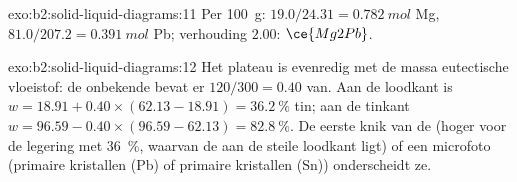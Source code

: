 \begin{solution}{exo:b2:solid-liquid-diagrams:11}
Per \qty{100}{g}: $19.0/24.31 = \qty{0.782}{mol}$ Mg, $81.0/207.2 =
\qty{0.391}{mol}$ Pb; verhouding $2.00$: $\ce{Mg2Pb}$.
\end{solution}

\begin{solution}{exo:b2:solid-liquid-diagrams:12}
Het plateau is evenredig met de massa eutectische vloeistof: de onbekende bevat
er $120/300 = 0.40$ van. Aan de loodkant is $w = 18.91 + 0.40 \times (62.13 -
18.91) = 36.2~\%$ tin; aan de tinkant $w = 96.59 - 0.40 \times (96.59 - 62.13) =
82.8~\%$. De eerste knik van de  (hoger voor de legering met 36~\%,
waarvan de  aan de steile loodkant ligt) of een microfoto (primaire kristallen (Pb) of
primaire kristallen (Sn)) onderscheidt ze.
\end{solution}

